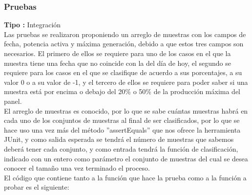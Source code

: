 \subsubsection{Pruebas}
\textbf{Tipo :} Integración \\ \newline
Las pruebas se realizaron proponiendo un arreglo de muestras con los campos de fecha, potencia activa y máxima generación, debido a que estos tres campos son necesarios. El primero de ellos se requiere para uno de los casos en el que la muestra tiene una fecha que no coincide con la del día de hoy, el segundo se requiere para los casos en el que se clasifique de acuerdo a sus porcentajes, a su valor 0 o a su valor de -1, y el tercero de ellos se requiere para poder saber si una muestra está por encima o debajo del 20\% o 50\% de la producción máxima del panel. \\ \newline
El arreglo de muestras es conocido, por lo que se sabe cuántas muestras habrá en cada uno de los conjuntos de muestras al final de ser clasificados, por lo que se hace uso una vez más del método ''assertEquals'' que nos ofrece la herramienta JUnit, y como salida esperada se tendrá el número de muestras que sabemos deberá tener cada conjunto, y como entrada tendrá la función de clasificación, indicado con un entero como parámetro el conjunto de muestras del cual se desea conocer el tamaño una vez terminado el proceso.  \\ \newline
El código que contiene tanto a la función que hace la prueba como a la función a probar es el siguiente: \\ \newline

